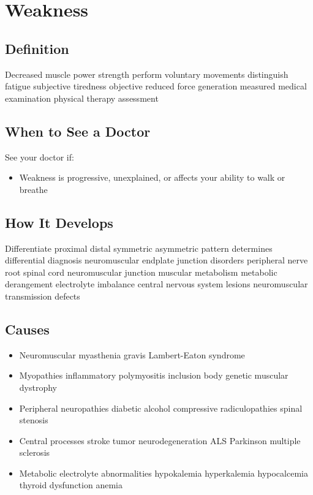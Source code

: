 \chapter{Weakness}

\section*{Definition}
Decreased muscle power strength perform voluntary movements distinguish fatigue subjective tiredness objective reduced force generation measured medical examination physical therapy assessment

\section*{When to See a Doctor}
See your doctor if:
\begin{itemize}
  \item Weakness is progressive, unexplained, or affects your ability to walk or breathe
\end{itemize}

\section*{How It Develops}
Differentiate proximal distal symmetric asymmetric pattern determines differential diagnosis neuromuscular endplate junction disorders peripheral nerve root spinal cord neuromuscular junction muscular metabolism metabolic derangement electrolyte imbalance central nervous system lesions neuromuscular transmission defects

\section*{Causes}
\begin{itemize}
  \item Neuromuscular myasthenia gravis Lambert-Eaton syndrome
  \item Myopathies inflammatory polymyositis inclusion body genetic muscular dystrophy
  \item Peripheral neuropathies diabetic alcohol compressive radiculopathies spinal stenosis
  \item Central processes stroke tumor neurodegeneration ALS Parkinson multiple sclerosis
  \item Metabolic electrolyte abnormalities hypokalemia hyperkalemia hypocalcemia thyroid dysfunction anemia
\end{itemize}


